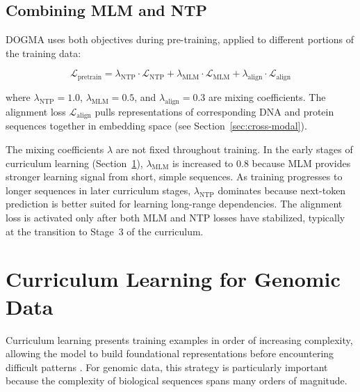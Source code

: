 \subsection{Combining MLM and NTP}

DOGMA uses both objectives during pre-training, applied to different portions of the training data:

\begin{equation}
\boxed{
\mathcal{L}_{\text{pretrain}} = \lambda_{\mathrm{NTP}} \cdot \mathcal{L}_{\mathrm{NTP}} + \lambda_{\mathrm{MLM}} \cdot \mathcal{L}_{\mathrm{MLM}} + \lambda_{\mathrm{align}} \cdot \mathcal{L}_{\mathrm{align}}
}
\label{eq:combined-pretrain}
\end{equation}

\noindent
where $\lambda_{\mathrm{NTP}} = 1.0$, $\lambda_{\mathrm{MLM}} = 0.5$, and $\lambda_{\mathrm{align}} = 0.3$ are mixing coefficients. The alignment loss $\mathcal{L}_{\mathrm{align}}$ pulls representations of corresponding DNA and protein sequences together in embedding space (see Section~\ref{sec:cross-modal}).

\begin{implnote}
The mixing coefficients $\lambda$ are not fixed throughout training. In the early stages of curriculum learning (Section~\ref{sec:curriculum}), $\lambda_{\mathrm{MLM}}$ is increased to 0.8 because MLM provides stronger learning signal from short, simple sequences. As training progresses to longer sequences in later curriculum stages, $\lambda_{\mathrm{NTP}}$ dominates because next-token prediction is better suited for learning long-range dependencies. The alignment loss is activated only after both MLM and NTP losses have stabilized, typically at the transition to Stage~3 of the curriculum.
\end{implnote}

\section{Curriculum Learning for Genomic Data}
\label{sec:curriculum}

Curriculum learning presents training examples in order of increasing complexity, allowing the model to build foundational representations before encountering difficult patterns \citep{bengio2009}. For genomic data, this strategy is particularly important because the complexity of biological sequences spans many orders of magnitude.

